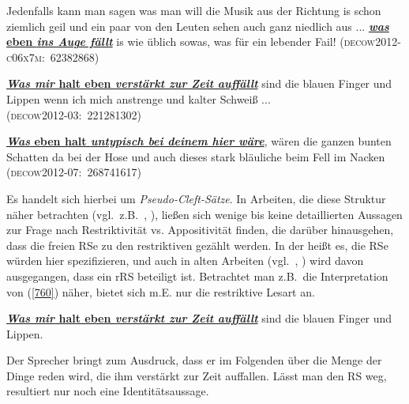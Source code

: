 \begin{exe}
	\ex\label{757} 

	Jedenfalls kann man sagen was man will die Musik aus der Richtung is schon ziemlich geil und ein paar von den Leuten sehen auch ganz niedlich aus ... \ul{\textbf{\textit{was} eben \textit{ins Auge fällt}}} is wie üblich sowas, was für ein 		lebender Fail! 	                                                                            
	\hfill\hbox{\scshape(decow2012-c06x7m: 62382868)}
\end{exe} 	 
	
\begin{exe}
	\ex\label{758}
 
	\ul{\textbf{\textit{Was mir} halt eben \textit{verstärkt zur Zeit auffällt}}} sind die blauen Finger und Lippen wenn ich mich anstrenge und kalter Schweiß ... \\ 	                                                                            
	\hbox{}\hfill\hbox{\scshape(decow2012-03: 221281302)}
\end{exe} 				         
			       					                      
\begin{exe}
	\ex\label{759} 

	\ul{\textbf{\textit{Was} eben halt \textit{untypisch bei deinem hier wäre}}}, wären die ganzen bunten Schatten da bei der Hose und auch dieses stark bläuliche beim Fell im Nacken	                                                                            
	\hfill\hbox{\scshape(decow2012-07: 268741617)}
\end{exe} 
 Es handelt sich hierbei um  \textit{Pseudo-Cleft-Sätze}. In Arbeiten, die diese Struktur näher betrachten (vgl.\ z.B.\ \citealt[360]{Lehmann1984}, \citealt[Kapitel 8]{Birkner2008}), ließen sich wenige bis keine detaillierten Aussagen zur Frage nach Restriktivität vs. Appositivität finden, die darüber hinausgehen, dass die freien RSe zu den restriktiven gezählt werden. In der \citet[1036]{Duden2009} heißt es, die RSe würden hier spezifizieren, und auch in alten Arbeiten (vgl.\ \citealt[95, 100]{Motsch1970}, \citealt[81]{Valgard1971}) wird davon ausgegangen, dass ein rRS beteiligt ist. Betrachtet man z.B.\ die Interpretation von (\ref{760}) näher, bietet sich m.E. nur die restriktive Lesart an.

\begin{exe}
	\ex\label{760} 
	\ul{\textbf{\textit{Was mir} halt eben \textit{verstärkt zur Zeit auffällt}}} sind die blauen Finger und Lippen.
\end{exe} 
Der Sprecher bringt zum Ausdruck, dass er im Folgenden über die Menge der Dinge reden wird, die ihm verstärkt zur Zeit auffallen. Lässt man den RS weg, resultiert nur noch eine Identitätsaussage.

